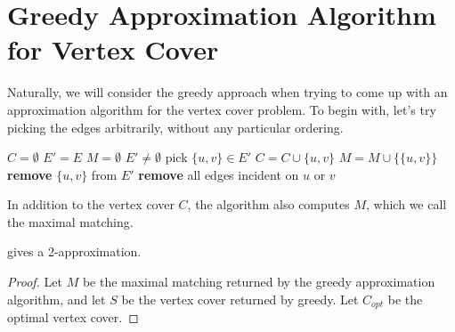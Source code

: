 \section{Greedy Approximation Algorithm for Vertex Cover}

Naturally, we will consider the greedy approach when trying to come up with an approximation algorithm for the vertex cover problem. To begin with, let's try picking the edges arbitrarily, without any particular ordering.

\begin{codebox}
    \li $C = \emptyset$
    \li $E' = E$
    \li $M = \emptyset$ 
    \li \While $E' \neq \emptyset$ \Do
        \li pick $\{u,v\} \in E'$
        \li $C = C \cup \{u,v\}$ 
        \li $M = M \cup \{\{u,v\}\}$ 
        \li \textbf{remove} $\{u,v\}$ from $E'$ 
        \li \textbf{remove} all edges incident on $u$ or $v$
\end{codebox}

In addition to the vertex cover $C$, the algorithm also computes $M$, which we call the maximal matching.

\begin{theorem}
     gives a 2-approximation.
\end{theorem}

\begin{proof}
    Let $M$ be the maximal matching returned by the greedy approximation algorithm, and let $S$ be the vertex cover returned by greedy. Let $C_{opt}$ be the optimal vertex cover.
\end{proof}